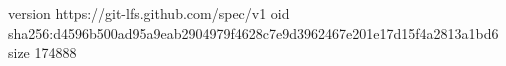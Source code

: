 version https://git-lfs.github.com/spec/v1
oid sha256:d4596b500ad95a9eab2904979f4628c7e9d3962467e201e17d15f4a2813a1bd6
size 174888
